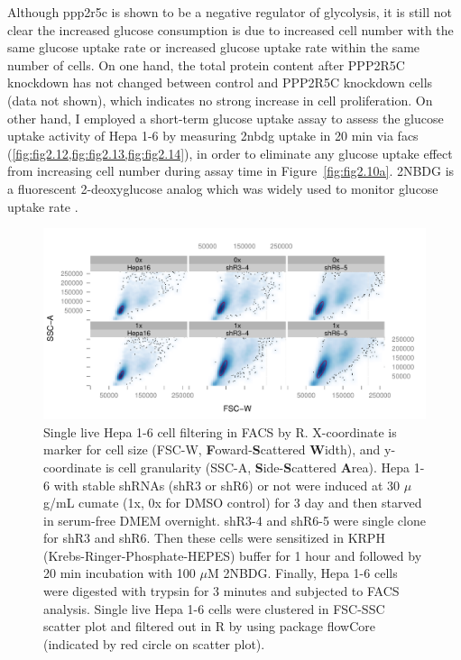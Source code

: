 Although \gls{ppp2r5c} is shown to be a negative regulator of glycolysis, it is still not clear the increased glucose consumption is due to increased cell number with the same glucose uptake rate or increased glucose uptake rate within the same number of cells. On one hand, the total protein content after PPP2R5C knockdown has not changed between control and PPP2R5C knockdown cells (data not shown), which indicates no strong increase in cell proliferation. On other hand, I employed a short-term glucose uptake assay to assess the glucose uptake activity of Hepa 1-6 by measuring \gls{2nbdg} uptake in 20 min via \gls{facs} (\cref{fig:fig2.12,fig:fig2.13,fig:fig2.14}), in order to eliminate any glucose uptake effect from increasing cell number during assay time in Figure~\ref{fig:fig2.10a}. 2NBDG is a fluorescent 2-deoxyglucose analog which was widely used to monitor glucose uptake rate \cite{zou_2-nbdg_2005,nitin_molecular_2009,oneil_uptake_2005,zhong_histone_2010,kawauchi_p53_2008}.

\begin{figure}[!tbp]
\centering
\includegraphics[width=1\textwidth]{figs/fig2-12 facs filter.pdf}
\caption[FACS filtering for single live Hepa 1-6 cell]{\footnotesize Single live Hepa 1-6 cell filtering in FACS by R. X-coordinate is marker for cell size (FSC-W, \textbf{F}oward-\textbf{S}cattered \textbf{W}idth), and y-coordinate is cell granularity (SSC-A, \textbf{S}ide-\textbf{S}cattered \textbf{A}rea). Hepa 1-6 with stable shRNAs (shR3 or shR6) or not were induced at 30 $\mu$g/mL cumate (1x, 0x for DMSO control) for 3 day and then starved in serum-free DMEM overnight. shR3-4 and shR6-5 were single clone for shR3 and shR6. Then these cells were sensitized in KRPH (Krebs-Ringer-Phosphate-HEPES) buffer for 1 hour and followed by 20 min incubation with 100 $\mu$M 2NBDG. Finally, Hepa 1-6 cells were digested with trypsin for 3 minutes and subjected to FACS analysis. Single live Hepa 1-6 cells were clustered in FSC-SSC scatter plot and filtered out in R by using package flowCore (indicated by red circle on scatter plot).}
\label{fig:fig2.12}
\end{figure}

